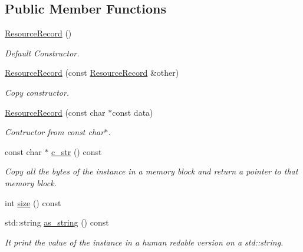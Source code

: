 \subsection*{Public Member Functions}
\begin{DoxyCompactItemize}
\item 
\hyperlink{structdns_1_1ResourceRecord_a6949837726969a3a556bc4be792c48db}{Resource\+Record} ()
\begin{DoxyCompactList}\small\item\em Default Constructor. \end{DoxyCompactList}\item 
\hyperlink{structdns_1_1ResourceRecord_a1d953b0a89f6e04b6d28072d776eb3dd}{Resource\+Record} (const \hyperlink{structdns_1_1ResourceRecord}{Resource\+Record} \&other)
\begin{DoxyCompactList}\small\item\em Copy constructor. \end{DoxyCompactList}\item 
\hyperlink{structdns_1_1ResourceRecord_a0d9cb7a786c964487cd16191fee9c8de}{Resource\+Record} (const char $\ast$const data)
\begin{DoxyCompactList}\small\item\em Contructor from const char$\ast$. \end{DoxyCompactList}\item 
const char $\ast$ \hyperlink{structdns_1_1ResourceRecord_a44230c7a2543fcf77060eed526d76fa1}{c\+\_\+str} () const 
\begin{DoxyCompactList}\small\item\em Copy all the bytes of the instance in a memory block and return a pointer to that memory block. \end{DoxyCompactList}\item 
int \hyperlink{structdns_1_1ResourceRecord_ac686d613eaa1567545ec4cb599d22e32}{size} () const 
\item 
std\+::string \hyperlink{structdns_1_1ResourceRecord_acbc8eaef9fb71167e40565cbc8f17a0d}{as\+\_\+string} () const 
\begin{DoxyCompactList}\small\item\em It print the value of the instance in a human redable version on a std\+::string. \end{DoxyCompactList}\end{DoxyCompactItemize}
